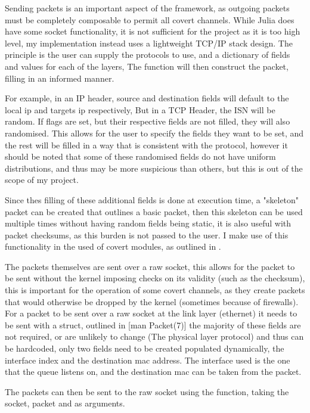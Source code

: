 Sending packets is an important aspect of the framework, as outgoing packets must be completely composable to permit all covert channels. While Julia does have some socket functionality, it is not sufficient for the project as it is too high level, my implementation instead uses a lightweight TCP/IP stack design. The principle is the user can supply the protocols to use, and a dictionary of fields and values for each of the layers, The function will then construct the packet, filling in an informed manner.

For example, in an IP header, source and destination fields will default to the local ip and targets ip respectively, But in a TCP Header, the ISN will be random. If flags are set, but their respective fields are not filled, they will also randomised. This allows for the user to specify the fields they want to be set, and the rest will be filled in a way that is consistent with the protocol, however it should be noted that some of these randomised fields do not have uniform distributions, and thus may be more suspicious than others, but this is out of the scope of my project.
 
Since thes filling of these additional fields is done at execution time, a "skeleton" packet can be created that outlines a basic packet, then this skeleton can be used multiple times without having random fields being static, it is also useful with packet checksums, as this burden is not passed to the user. I make use of this functionality in the used of covert modules, as outlined in .

The packets themselves are sent over a raw socket, this allows for the packet to be sent without the kernel imposing checks on its validity (such as the checksum), this is important for the operation of some covert channels, as they create packets that would otherwise be dropped by the kernel (sometimes because of firewalls). For a packet to be sent over a raw socket at the link layer (ethernet) it needs to be sent with a  struct, outlined in [man Packet(7)] the majority of these fields are not required, or are unlikely to change (The physical layer protocol) and thus can be hardcoded, only two fields need to be created populated dynamically, the interface index and the destination mac address. The interface used is the one that the queue listens on, and the destination mac can be taken from the packet.

The packets can then be sent to the raw socket using the  function, taking the socket, packet and  as arguments.

